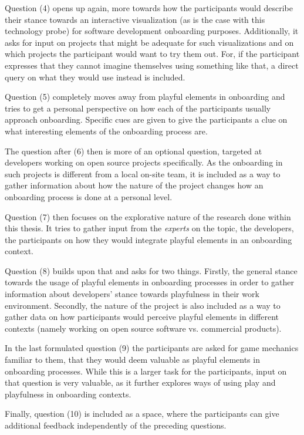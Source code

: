 Question (4) opens up again, more towards how the participants would describe their stance towards an interactive visualization (as is the case with this technology probe) for software development onboarding purposes. Additionally, it asks for input on projects that might be adequate for such visualizations and on which projects the participant would want to try them out. For, if the participant expresses that they cannot imagine themselves using something like that, a direct query on what they would use instead is included.

Question (5) completely moves away from playful elements in onboarding and tries to get a personal perspective on how each of the participants usually approach onboarding. Specific cues are given to give the participants a clue on what interesting elements of the onboarding process are.

The question after (6) then is more of an optional question, targeted at developers working on open source projects specifically. As the onboarding in such projects is different from a local on-site team, it is included as a way to gather information about how the nature of the project changes how an onboarding process is done at a personal level.

Question (7) then focuses on the explorative nature of the research done within this thesis. It tries to gather input from the \textit{experts} on the topic, the developers, the participants on how they would integrate playful elements in an onboarding context.

Question (8) builds upon that and asks for two things. Firstly, the general stance towards the usage of playful elements in onboarding processes in order to gather information about developers' stance towards playfulness in their work environment. Secondly, the nature of the project is also included as a way to gather data on how participants would perceive playful elements in different contexts (namely working on open source software vs. commercial products).

In the last formulated question (9) the participants are asked for game mechanics familiar to them, that they would deem valuable as playful elements in onboarding processes. While this is a larger task for the participants, input on that question is very valuable, as it further explores ways of using play and playfulness in onboarding contexts.

Finally, question (10) is included as a space, where the participants can give additional feedback independently of the preceding questions.


